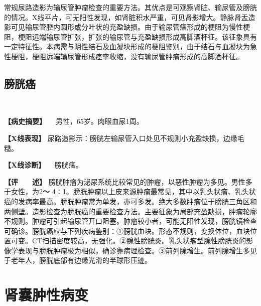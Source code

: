 常规尿路造影为输尿管肿瘤检查的重要方法。其优点是可观察肾脏、输尿管及膀胱的情况。X线平片，可无阳性发现，如肾脏积水严重，可见肾影增大。静脉肾盂造影可见输尿管腔内圆形或分叶状的充盈缺损。由于输尿管癌形成的梗阻为慢性梗阻，梗阻远端输尿管扩张，扩张的输尿管与充盈缺损形成高脚酒杯征。该征象具有一定特征性。本病需与阴性结石及血凝块形成的梗阻鉴别，由于结石与血凝块为急性梗阻，梗阻远端输尿管形成痉挛收缩，没有输尿管肿瘤形成的高脚酒杯征。

\subsection{膀胱癌}

\begin{figure}
    \centering
    \\
    \caption{}
    \label{fig6-5-5}
\end{figure}

\textbf{【病史摘要】} 　男性，65岁。肉眼血尿1周。

\textbf{【X线表现】}
尿路造影示：膀胱左输尿管入口处见不规则小充盈缺损，边缘毛糙。

\textbf{【X线诊断】} 　膀胱癌。

\textbf{【评　　述】}
膀胱肿瘤为泌尿系统比较常见的肿瘤，以恶性肿瘤为多见。男性多于女性，为2\textbf{～}
4∶1。膀胱肿瘤以上皮来源肿瘤最常见，其中以乳头状瘤、乳头状癌的发病率最高。膀胱肿瘤常为单发，亦可多发。绝大多数肿瘤位于膀胱三角区和两侧壁。造影检查为膀胱癌的重要检查方法。主要征象为局部充盈缺损，肿瘤轮廓不规则。肿瘤可引起输尿管开口阻塞。肿瘤较小者，可能无阳性发现，膀胱镜检查可确诊。膀胱癌应与下列疾病鉴别：①膀胱血块。形态不规则，变换体位，血块位置可变。CT扫描密度较高，无强化。②腺性膀胱炎。乳头状瘤型腺性膀胱炎的影像学表现与膀胱肿瘤极为相似，确诊靠病理检查。③前列腺增生。前列腺增生多见于老年人，膀胱底部有边缘光滑的半球形压迹。

\section{肾囊肿性病变}

